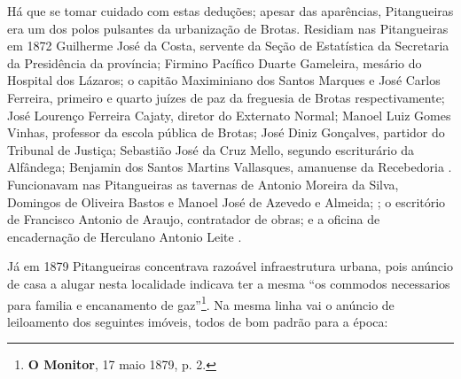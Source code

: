 Há que se tomar cuidado com estas deduções; apesar das aparências, Pitangueiras era um dos polos pulsantes da urbanização de Brotas. Residiam nas Pitangueiras em 1872 Guilherme José da Costa, servente da Seção de Estatística da Secretaria da Presidência da província; Firmino Pacífico Duarte Gameleira, mesário do Hospital dos Lázaros; o capitão Maximiniano dos Santos Marques e José Carlos Ferreira, primeiro e quarto juízes de paz da freguesia de Brotas respectivamente; José Lourenço Ferreira Cajaty, diretor do Externato Normal; Manoel Luiz Gomes Vinhas, professor da escola pública de Brotas; José Diniz Gonçalves, partidor do Tribunal de Justiça; Sebastião José da Cruz Mello, segundo escriturário da Alfândega; Benjamin dos Santos Martins Vallasques, amanuense da Recebedoria \cite[segunda~parte, pp.~59, 85, 90, 91, 97, 98, 128, 167, 180]{pimenta_almanak_1872}. Funcionavam nas Pitangueiras as tavernas de Antonio Moreira da Silva, Domingos de Oliveira Bastos e Manoel José de Azevedo e Almeida; \cite[terceira~parte, pp.~40, 41, 48]{pimenta_almanak_1872}; o escritório de Francisco Antonio de Araujo, contratador de obras; e a oficina de encadernação de Herculano Antonio Leite \cite[quarta~parte, pp.~12, 39]{pimenta_almanak_1872}.

Já em 1879 Pitangueiras concentrava razoável infraestrutura urbana, pois anúncio de casa a alugar nesta localidade indicava ter a mesma ``os commodos necessarios para familia e encanamento de gaz''\footnote{\textbf{O Monitor}, 17 maio 1879, p. 2.}. Na mesma linha vai o anúncio de leiloamento dos seguintes imóveis, todos de bom padrão para a época:

